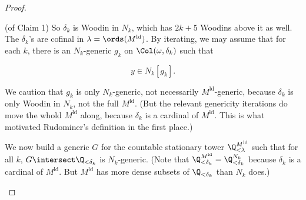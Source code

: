 \documentclass[oneside,12pt]{amsart}
\begin{document}
\begin{proof}
\begin{subproof}{(of Claim 1)}
So $\delta_k$ is Woodin in $N_k$, which has $2k+5$ Woodins above it as well. The
$\delta_k$'s are cofinal in $\lambda=\ords(M^{\text{ld}})$. By iterating,
we may assume that for each $k$, there is an $N_k$-generic $g_k$ on
$\Col(\omega,\delta_k)$ such that

$$
y\in N_k[g_k].
$$

We caution that $g_k$ is only $N_k$-generic, not necessarily $M^{\text{ld}}$-generic,
because $\delta_k$ is only Woodin in $N_k$, not the full $M^{\text{ld}}$.
(But the relevant genericity iterations do move the whold $M^{\text{ld}}$ along,
because $\delta_k$ is a cardinal of $M^{\text{ld}}$. This is what motivated
Rudominer's definition in the first place.)

We now build a generic $G$ for the countable stationary tower $\Q^{M^{\text{ld}}}_{<\lambda}$
such that for all $k$, $G\intersect \Q_{<\delta_k}$ is $N_k$-generic. (Note that
$\Q^{M^{\text{ld}}}_{<\delta_k}=\Q^{N_k}_{<\delta_k}$ because $\delta_k$ is
a cardinal of $M^{\text{ld}}$. But $M^{\text{ld}}$ has more dense subsets of $\Q_{<\delta_k}$
than $N_k$ does.)

\end{subproof}

\end{proof}




\end{document}
